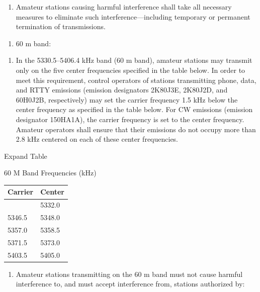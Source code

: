\documentclass[
  letterpaper,
  DIV=11,
  numbers=noendperiod]{scrreport}
\providecommand{\tightlist}{%
  \setlength{\itemsep}{0pt}\setlength{\parskip}{0pt}}\usepackage{longtable,booktabs,array}
\begin{document}
\begin{enumerate}
\def\labelenumi{(\arabic{enumi})}
\setcounter{enumi}{4}
\tightlist
\item
  Amateur stations causing harmful interference shall take all necessary
  measures to eliminate such interference---including temporary or
  permanent termination of transmissions.
\end{enumerate}

\begin{enumerate}
\def\labelenumi{(\alph{enumi})}
\setcounter{enumi}{7}
\tightlist
\item
  60 m band:
\end{enumerate}

\begin{enumerate}
\def\labelenumi{(\arabic{enumi})}
\tightlist
\item
  In the 5330.5--5406.4 kHz band (60 m band), amateur stations may
  transmit only on the five center frequencies specified in the table
  below. In order to meet this requirement, control operators of
  stations transmitting phone, data, and RTTY emissions (emission
  designators 2K80J3E, 2K80J2D, and 60H0J2B, respectively) may set the
  carrier frequency 1.5 kHz below the center frequency as specified in
  the table below. For CW emissions (emission designator 150HA1A), the
  carrier frequency is set to the center frequency. Amateur operators
  shall ensure that their emissions do not occupy more than 2.8 kHz
  centered on each of these center frequencies.
\end{enumerate}

Expand Table

60 M Band Frequencies (kHz)

\begin{longtable}[]{@{}ll@{}}
\toprule\noalign{}
Carrier & Center \\
\midrule\noalign{}
\endhead
\bottomrule\noalign{}
\endlastfoot
5330.5 & 5332.0 \\
5346.5 & 5348.0 \\
5357.0 & 5358.5 \\
5371.5 & 5373.0 \\
5403.5 & 5405.0 \\
\end{longtable}

\begin{enumerate}
\def\labelenumi{(\arabic{enumi})}
\setcounter{enumi}{1}
\tightlist
\item
  Amateur stations transmitting on the 60 m band must not cause harmful
  interference to, and must accept interference from, stations
  authorized by:
\end{enumerate}
\end{document}
